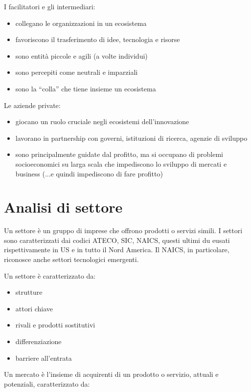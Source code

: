 \documentclass[answers, a4paper, 11pt]{exam}
\begin{document}
I facilitatori e gli intermediari:

\begin{itemize}
    \item collegano le organizzazioni in un ecosistema
    \item favoriscono il trasferimento di idee, tecnologia e risorse
    \item sono entità piccole e agili (a volte individui)
    \item sono percepiti come neutrali e imparziali
    \item sono la ``colla'' che tiene insieme un ecosistema
\end{itemize}

Le aziende private:

\begin{itemize}
    \item giocano un ruolo cruciale negli ecosistemi dell'innovazione
    \item lavorano in partnership con governi, istituzioni di ricerca, agenzie di sviluppo
    \item sono principalmente guidate dal profitto, ma si occupano di problemi socioeconomici su larga scala che impediscono lo sviluppo di mercati e business (...e quindi impediscono di fare profitto)
\end{itemize}

\section{Analisi di settore}

Un settore è un gruppo di imprese che offrono prodotti o servizi simili.
I settori sono caratterizzati dai codici ATECO, SIC, NAICS, questi ultimi du eusati rispettivamente in US e in tutto il Nord America. Il NAICS, in particolare, riconosce anche settori tecnologici emergenti.

Un settore è caratterizzato da:

\begin{itemize}
    \item strutture
    \item attori chiave
    \item rivali e prodotti sostitutivi
    \item differenziazione
    \item barriere all'entrata
\end{itemize}

Un mercato è l'insieme di acquirenti di un prodotto o servizio, attuali e potenziali, caratterizzato da:
\end{document}
